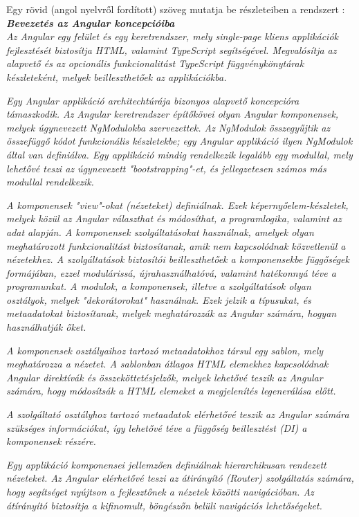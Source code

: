 Egy rövid (angol nyelvről fordított) szöveg mutatja be részleteiben a rendszert \cite{angularcikk}:\\

\noindent\textit{\textbf{\large{Bevezetés az Angular koncepcióiba}}}\\

\textit{Az Angular egy felület és egy keretrendszer, mely single-page kliens applikációk fejlesztését biztosítja HTML, valamint TypeScript segítségével. Megvalósítja az alapvető és az opcionális funkcionalitást TypeScript függvénykönytárak készleteként, melyek beilleszthetőek az applikációkba.}

\textit{Egy Angular applikáció architechtúrája bizonyos alapvető koncepcióra támaszkodik. Az Angular keretrendszer építőkövei olyan Angular komponensek, melyek úgynevezett NgModulokba szervezettek. Az NgModulok összegyűjtik az összefüggő kódot funkcionális készletekbe; egy Angular applikáció ilyen NgModulok által van definiálva. Egy applikáció mindig rendelkezik legalább egy modullal, mely lehetővé teszi az úgynevezett "bootstrapping"-et, és jellegzetesen számos más modullal rendelkezik.}

\textit{A komponensek "view"-okat (nézeteket) definiálnak. Ezek képernyőelem-készletek, melyek közül az Angular választhat és módosíthat, a programlogika, valamint az adat alapján. A komponensek szolgáltatásokat használnak, amelyek olyan meghatározott funkcionalitást biztosítanak, amik nem kapcsolódnak közvetlenül a nézetekhez. A szolgáltatások biztosítói beilleszthetőek a komponensekbe függőségek formájában, ezzel modulárissá, újrahasználhatóvá, valamint hatékonnyá téve a programunkat. A modulok, a komponensek, illetve a szolgáltatások olyan osztályok, melyek "dekorátorokat" használnak. Ezek jelzik a típusukat, és metaadatokat biztosítanak, melyek meghatározzák az Angular számára, hogyan használhatják őket.}


\textit{A komponensek osztályaihoz tartozó metaadatokhoz társul egy sablon, mely meghatározza a nézetet. A sablonban átlagos HTML elemekhez kapcsolódnak Angular direktívák és összeköttetésjelzők, melyek lehetővé teszik az Angular számára, hogy módosítsák a HTML elemeket a megjelenítés legenerálása előtt.}

\textit{A szolgáltató osztályhoz tartozó metaadatok elérhetővé teszik az Angular számára szükséges információkat, így lehetővé téve a függőség beillesztést (DI) a komponensek részére.}

\textit{Egy applikáció komponensei jellemzően definiálnak hierarchikusan rendezett nézeteket. Az Angular elérhetővé teszi az átirányító (Router) szolgáltatás számára, hogy segítséget nyújtson a fejlesztőnek a nézetek közötti navigációban. Az átírányító biztosítja a kifinomult, böngészőn belüli navigációs lehetőségeket.}

